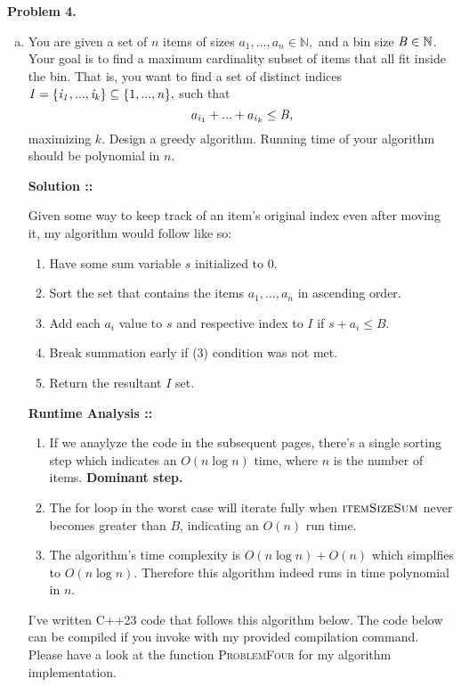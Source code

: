 \documentclass[11pt]{article}
\begin{document}
\textbf{Problem 4.} 
\begin{enumerate}[(a)]
\item 
You are given a set of $n$ items of sizes $a_1,...,a_n\in\mathbb{N},$
and a bin size $\it{B}\in\mathbb{N}$. Your goal is to find a maximum cardinality
subset of items that all fit inside the bin. That is, you want to find a set of
distinct indices $\it{I}=\{i_1,...,i_k\}\subseteq\{\text{1},...,n\},$ such that
$$a_{i_1}+...+a_{i_k}\le\it{B,}$$
maximizing $k$. Design a greedy algorithm. Running time of your algorithm should
be polynomial in $n$.

\vspace{5px}\textbf{Solution ::}

Given some way to keep track of an item's original index even after moving it, 
my algorithm would follow like so:
\begin{enumerate}[1.]
    \item Have some sum variable $s$ initialized to 0.
    \item Sort the set that contains the items $a_1,...,a_n$ in ascending order.
    \item Add each $a_i$ value to $s$ and respective index to $I$ if $s + a_i \le B$.
    \item Break summation early if (3) condition was not met.
    \item Return the resultant $I$ set.
\end{enumerate}

\textbf{Runtime Analysis ::}
\begin{enumerate}[1.]
\item 
If we anaylyze the code in the subsequent pages, there's a single sorting step which
indicates an $O(n \log n)$ time, where $n$ is the number of items.
\textbf{Dominant step.}

\item 
The for loop in the worst case will iterate fully when $\textsc{itemSizeSum}$ 
never becomes greater than $B$, indicating an $O(n)$ run time.

\item 
The algorithm’s time complexity is $O(n\log n) + O(n)$ which
simplfies to $O(n\log n)$. Therefore this algorithm indeed runs in time
polynomial in $n$.
\end{enumerate}

I've written C++23 code that follows this algorithm below. The code below can be
compiled if you invoke with my provided compilation command. Please have a look at the
function \textsc{ProblemFour} for my algorithm implementation.
\pagebreak


\end{enumerate}
\end{document}

